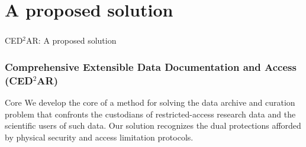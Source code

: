 

\section[Solution]{A proposed solution}
\begin{frame}
\frametitle{}
\begin{block}{CED$^2$AR: A proposed solution}

\end{block}
\end{frame}

\begin{frame}
\frametitle{Comprehensive Extensible Data Documentation and Access (CED$^2$AR)}
\begin{block}{Core}
We develop the core of a method for solving the data archive
and curation problem that confronts the custodians of restricted-access
research data and the scientific users of such data. Our solution recognizes 
the dual protections afforded by physical security and access limitation protocols.
\end{block}
\end{frame}

